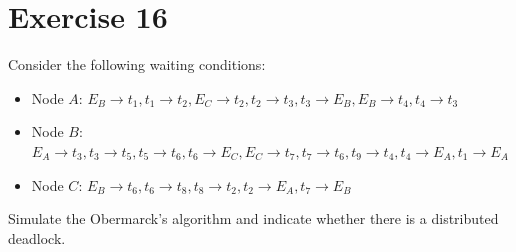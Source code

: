 \section{Exercise 16}

Consider the following waiting conditions:
\begin{itemize}
    \item Node $A$: $E_B \rightarrow t_1, t_1 \rightarrow t_2, E_C \rightarrow t_2, t_2 \rightarrow t_3, t_3 \rightarrow E_B, E_B \rightarrow t_4, t_4 \rightarrow t_3$
    \item Node $B$: $E_A \rightarrow t_3, t_3 \rightarrow t_5, t_5 \rightarrow t_6, t_6 \rightarrow E_C, E_C \rightarrow t_7, t_7 \rightarrow t_6, t_9 \rightarrow t_4,t_4 \rightarrow E_A, t_1 \rightarrow E_A$
    \item Node $C$: $E_B \rightarrow t_6, t_6 \rightarrow t_8, t_8 \rightarrow t_2, t_2 \rightarrow E_A, t_7 \rightarrow E_B$
\end{itemize}
Simulate the Obermarck's algorithm and indicate whether there is a distributed deadlock.
    
